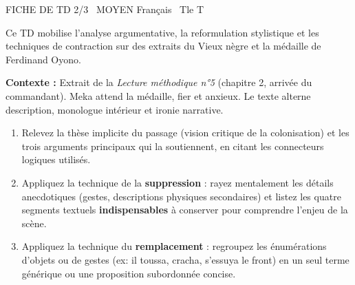 \documentclass[11pt]{article}
\begin{document}
\begin{tcolorbox}[enhanced,colback=popink,colframe=popink,arc=10pt,boxrule=0pt,left=12pt,right=12pt,top=9pt,bottom=9pt]
{\color{white}\popxbold\small FICHE DE TD 2/3 \textbullet\ MOYEN \hfill Français \textbullet\ Tle T\par}
\end{tcolorbox}
\vspace{4pt}
Ce TD mobilise l'analyse argumentative, la reformulation stylistique et les techniques de contraction sur des extraits du \og Vieux nègre et la médaille \fg{} de Ferdinand Oyono.

\begin{exercice}
\textbf{Contexte :} Extrait de la \textit{Lecture méthodique n°5} (chapitre 2, arrivée du commandant). Meka attend la médaille, fier et anxieux. Le texte alterne description, monologue intérieur et ironie narrative.

\begin{enumerate}
    \item Relevez la thèse implicite du passage (vision critique de la colonisation) et les trois arguments principaux qui la soutiennent, en citant les connecteurs logiques utilisés.
    \item Appliquez la technique de la \textbf{suppression} : rayez mentalement les détails anecdotiques (gestes, descriptions physiques secondaires) et listez les quatre segments textuels \textbf{indispensables} à conserver pour comprendre l'enjeu de la scène.
    \item Appliquez la technique du \textbf{remplacement} : regroupez les énumérations d'objets ou de gestes (ex: \og il toussa, cracha, s'essuya le front\fg{}) en un seul terme générique ou une proposition subordonnée concise.
\end{enumerate}
\end{exercice}
\end{document}
